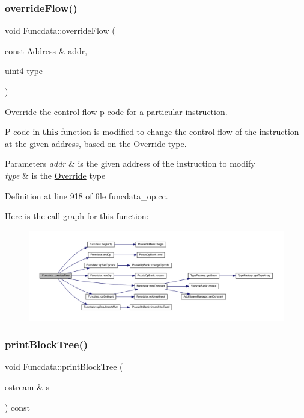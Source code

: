 \subsubsection{\texorpdfstring{overrideFlow()}{overrideFlow()}}
{\footnotesize\ttfamily void Funcdata\+::override\+Flow (\begin{DoxyParamCaption}\item[{const \mbox{\hyperlink{class_address}{Address}} \&}]{addr,  }\item[{uint4}]{type }\end{DoxyParamCaption})}



\mbox{\hyperlink{class_override}{Override}} the control-\/flow p-\/code for a particular instruction. 

P-\/code in {\bfseries{this}} function is modified to change the control-\/flow of the instruction at the given address, based on the \mbox{\hyperlink{class_override}{Override}} type. 
\begin{DoxyParams}{Parameters}
{\em addr} & is the given address of the instruction to modify \\
\hline
{\em type} & is the \mbox{\hyperlink{class_override}{Override}} type \\
\hline
\end{DoxyParams}


Definition at line 918 of file funcdata\+\_\+op.\+cc.

Here is the call graph for this function\+:
\nopagebreak
\begin{figure}[H]
\begin{center}
\leavevmode
\includegraphics[width=350pt]{class_funcdata_aafb83719ca201b5d57283058e2bcadee_cgraph}
\end{center}
\end{figure}
\mbox{\label{class_funcdata_a8c86861b22f4beb1cac5ab3ab43db6ae}} 
\subsubsection{\texorpdfstring{printBlockTree()}{printBlockTree()}}
{\footnotesize\ttfamily void Funcdata\+::print\+Block\+Tree (\begin{DoxyParamCaption}\item[{ostream \&}]{s }\end{DoxyParamCaption}) const}



